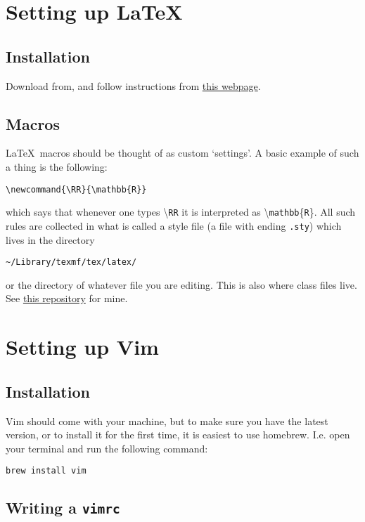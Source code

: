 \documentclass{amsart}
\begin{document}
\section{Setting up \LaTeX}

\subsection{Installation}

Download from, and follow instructions from \href{http://www.tug.org/mactex/}{this
webpage}.

\subsection{Macros}
\LaTeX\ macros should be thought of as custom `settings'. A basic example of such a thing
is the following:
\begin{verbatim}
\newcommand{\RR}{\mathbb{R}}
\end{verbatim}
which says that whenever one types \textbackslash\texttt{RR}
it is interpreted as \textbackslash\texttt{mathbb}\{\texttt{R}\}. All such rules are collected in what
is called a style file (a file with ending \texttt{.sty}) which lives in the directory 
\begin{verbatim}
~/Library/texmf/tex/latex/
\end{verbatim}
or the directory of whatever file you are editing. This is also where class files live.
See \href{https://github.com/jacksontvd/tex/tree/master/tex/latex}{this repository} for
mine.

\section{Setting up Vim}

\subsection{Installation}

Vim should come with your machine, but to make sure you have the latest version, or to
install it for the first time, it is easiest to use homebrew. I.e. 
open your terminal and run the following command:
\begin{verbatim}
brew install vim
\end{verbatim}

\subsection{Writing a \texttt{vimrc}}
\label{sec:vimrc}
\end{document}
